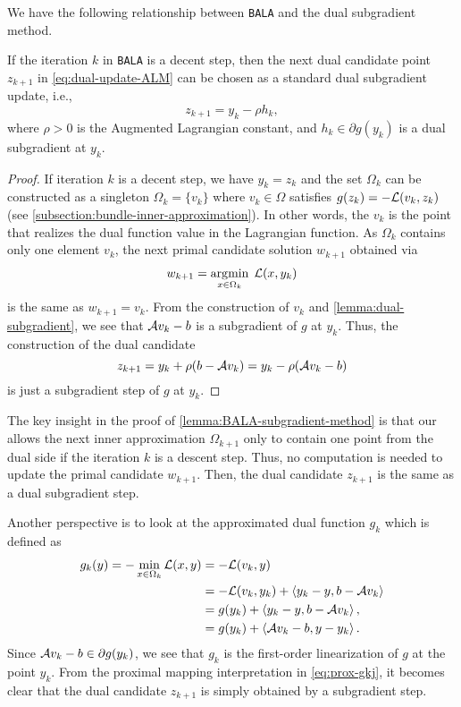 \documentclass[11pt]{article}
\newcommand{\alg}{\texttt{BALA}}%
\begin{document}
We have the following relationship between \alg{} and the dual subgradient method. 

\begin{lemma} \label{lemma:BALA-subgradient-method}
    If the iteration $k$ in \alg{} is a decent step, then the next dual candidate point $z_{k+1}$ in \cref{eq:dual-update-ALM} can be chosen as a standard dual subgradient update, i.e., 
    $$
    z_{k+1} = y_k - \rho h_k,
    $$
    where $\rho >0$ is the Augmented Lagrangian constant, and $h_k \in \partial g(y_k)$ is a dual subgradient at $y_k$.
\end{lemma}

\begin{proof}
     
If iteration $k$ is a decent step, we have $y_{k} = z_{k}$ and the set $\Omega_{k}$ can be constructed as a singleton $\Omega_{k} = \{v_{k}\}$ where $v_{k} \in \Omega$ satisfies $g(z_{k}) = - \mathcal{L}(v_{k},z_{k})$ (see \cref{subsection:bundle-inner-approximation}). In other words, the $v_{k}$ is the point that realizes the dual function value in the Lagrangian function. As $\Omega_{k}$ contains only one element $v_{k}$, the next primal candidate solution $w_{k+1}$ obtained via
\begin{align*}
    w_{k+1} = \operatorname*{\arg\!\min}_{x \in \Omega_k} \;\mathcal{L}(x,y_k)
\end{align*}
is the same as $w_{k+1} = v_{k}$. From the construction of $v_k$ and \cref{lemma:dual-subgradient}, we see that $\mathcal{A} v_k -  b$ is a subgradient of $g$ at $y_k$. Thus, the construction of the dual candidate $$z_{k+1} = y_k + \rho (b- \mathcal{A} {v_k}) = y_k -  \rho ( \mathcal{A} {v_k} - b)$$ is just a subgradient step of $g$ at $y_k$.
\end{proof}

The key insight in the proof of \cref{lemma:BALA-subgradient-method} is that our  allows the next inner approximation $\Omega_{k+1}$ only to contain one point from the dual side if the iteration $k$ is a descent step. Thus, no computation is needed to update the primal candidate $w_{k+1}$. Then, the dual candidate $z_{k+1}$ is the same as a dual subgradient step. 

Another perspective is to look at the approximated dual function $g_k$ which is defined as 
\begin{align*}
    g_k(y) = - \min_{x \in \Omega_{k}} \mathcal{L}(x,y) & = - \mathcal{L}(v_{k},y) \\
    & =  -\mathcal{L}(v_{k},y_{k}) + \left \langle y_{k} - y, b-\mathcal{A} v_{k}  \right\rangle \\
            & = g(y_{k})+\left \langle y_{k} - y, b-\mathcal{A} v_{k} \right\rangle, \\
            & = g(y_{k})+\left \langle \mathcal{A} v_{k} - b , y - y_{k} \right\rangle.
\end{align*} 
Since $\mathcal{A} v_{k} - b \in \partial g(y_k)$, we see that $g_k$ is the first-order linearization of $g$ at the point $y_k$. From the proximal mapping interpretation in \eqref{eq:prox-gkj}, it becomes clear that the dual candidate $z_{k+1}$ is simply obtained by a subgradient step.
\end{document}
